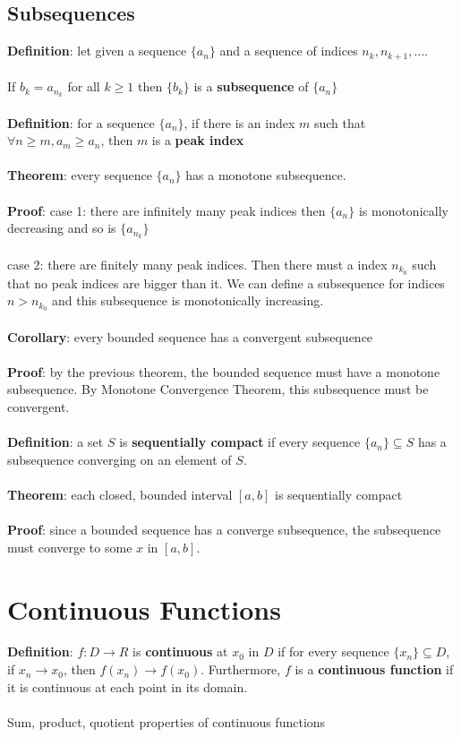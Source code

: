 \documentclass{article}
\begin{document}
  \subsection{Subsequences}
  \textbf{Definition}: let given a sequence $\{a_n\}$ and a sequence of indices $n_k, n_{k+1}, \ldots$. \\ \\
  If $b_k = a_{n_k}$ for all $k \geq 1$ then $\{b_k\}$ is a \textbf{subsequence} of $\{a_n\}$ \\ \\
  \textbf{Definition}: for a sequence $\{a_n\}$, if there is an index $m$ such that $\forall n \geq m, a_m \geq a_n$, then $m$ is a \textbf{peak index} \\ \\
  \textbf{Theorem}: every sequence $\{a_n\}$ has a monotone subsequence. \\ \\
  \textbf{Proof}: case 1: there are infinitely many peak indices then $\{a_n\}$ is monotonically decreasing and so is $\{a_{n_k}\}$ \\ \\
  case 2: there are finitely many peak indices. Then there must a index $n_{k_0}$ such that no peak indices are bigger than it. We can define a subsequence for indices $n > n_{k_0}$ and this subsequence is monotonically increasing. \\ \\
  \textbf{Corollary}: every bounded sequence has a convergent subsequence \\ \\
  \textbf{Proof}: by the previous theorem, the bounded sequence must have a monotone subsequence. By Monotone Convergence Theorem, this subsequence must be convergent. \\ \\
  \textbf{Definition}: a set $S$ is \textbf{sequentially compact} if every sequence $\{a_n\} \subseteq S$ has a subsequence converging on an element of $S$. \\ \\
  \textbf{Theorem}: each closed, bounded interval $[a,b]$ is sequentially compact \\ \\
  \textbf{Proof}: since a bounded sequence has a converge subsequence, the subsequence must converge to some $x$ in $[a,b]$.
  \section{Continuous Functions}
  \textbf{Definition}: $f \colon D \rightarrow R$ is \textbf{continuous} at $x_0$ in $D$ if for every sequence $\{x_n\} \subseteq D$, if $x_n \rightarrow x_0$, then $f(x_n) \rightarrow f(x_0)$. Furthermore, $f$ is a \textbf{continuous function} if it is continuous at each point in its domain. \\ \\
  Sum, product, quotient properties of continuous functions
\end{document}
